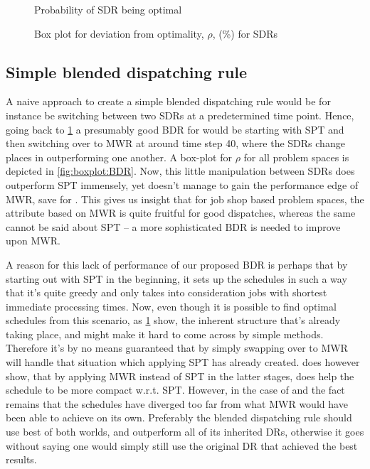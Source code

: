 \documentclass[smallextended]{svjour3}
\begin{document}
\begin{figure}
\centering
{}%
\caption{Probability of SDR being optimal}
\label{fig:opt:SDR}
\end{figure}

\begin{figure}
\centering
{}%
\caption{Box plot for deviation from optimality, $\rho$, (\%) for SDRs}
\label{fig:boxplot:SDR}
\end{figure}
 
\subsection{Simple blended dispatching rule}\label{sec:opt:bdr}
A naive approach to create a simple blended dispatching rule would be for instance be switching between two SDRs at a predetermined time point. Hence, going back to \cref{fig:opt:SDR} a presumably good BDR for   would be starting with SPT and then switching over to MWR at around time step 40, where the SDRs change places in outperforming one another. A box-plot for $\rho$ for all problem spaces is depicted in \cref{fig:boxplot:BDR}. Now, this little manipulation between SDRs does outperform SPT immensely, yet doesn't manage to gain the performance edge of MWR, save for . This gives us insight that for job shop based problem spaces, the attribute based on MWR is quite fruitful for good dispatches, whereas the same cannot be said about SPT -- a more sophisticated BDR is needed to improve upon MWR. 

A reason for this lack of performance of our proposed BDR is perhaps that by starting out with SPT in the beginning, it sets up the schedules in such a way that it's quite greedy and only takes into consideration jobs with shortest immediate processing times. Now, even though it is possible to find optimal schedules from this scenario, as \cref{fig:opt:SDR} show, the inherent structure that's already taking place, and might make it hard to come across by simple methods. Therefore it's by no means guaranteed that by simply swapping over to MWR will handle that situation which applying SPT has already created.  does however show, that by applying MWR instead of SPT in the latter stages, does help the schedule to be more compact w.r.t. SPT. However, in the case of   and   the fact remains that the schedules have diverged too far from what MWR would have been able to achieve on its own. Preferably the blended dispatching rule should use  best of both worlds, and outperform all of its inherited DRs, otherwise it goes without saying one would simply still use the original DR that achieved the best results.
\end{document}
